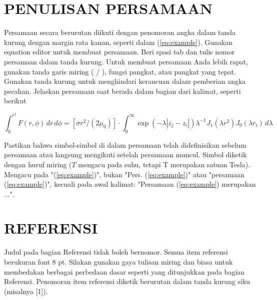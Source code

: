 \documentclass[10pt,twocolumn]{article}
\begin{document}
\twocolumn[
\begin{@twocolumnfalse}

\vspace{1em}
\end{@twocolumnfalse}
]









\section{\MakeUppercase{Penulisan Persamaan}}
Persamaan secara berurutan diikuti dengan penomoran angka dalam tanda kurung dengan margin rata kanan, seperti dalam (\ref{eq:example}). Gunakan equation editor untuk membuat persamaan. Beri spasi tab dan tulis nomor persamaan dalam tanda kurung. Untuk membuat persamaan Anda lebih rapat, gunakan tanda garis miring ( / ), fungsi pangkat, atau pangkat yang tepat. Gunakan tanda kurung untuk menghindari kerancuan dalam pemberian angka pecahan. Jelaskan persamaan saat berada dalam bagian dari kalimat, seperti berikut

\begin{equation}
\int_0^{r^2} F(r,\phi) \, dr \, d\phi = [\sigma r^2/(2\mu_0)] \cdot \int_0^{\infty} \exp(-\lambda|z_j - z_i|) \lambda^{-1} J_1(\lambda r^2) J_0(\lambda r_i) \, d\lambda
\label{eq:example}
\end{equation}

Pastikan bahwa simbol-simbol di dalam persamaan telah didefinisikan sebelum persamaan atau langsung mengikuti setelah persamaan muncul. Simbol diketik dengan huruf miring ($T$ mengacu pada suhu, tetapi T merupakan satuan Tesla). Mengacu pada "(\ref{eq:example})", bukan "Pers. (\ref{eq:example})" atau "persamaan (\ref{eq:example})", kecuali pada awal kalimat: "Persamaan (\ref{eq:example}) merupakan ...".

\section{\MakeUppercase{Referensi}}
Judul pada bagian Referensi tidak boleh bernomor. Semua item referensi berukuran font 8 pt. Silakan gunakan gaya tulisan miring dan biasa untuk membedakan berbagai perbedaan dasar seperti yang ditunjukkan pada bagian Referensi. Penomoran item referensi diketik berurutan dalam tanda kurung siku (misalnya [1]).
\end{document}
